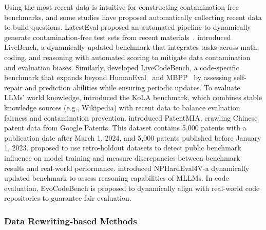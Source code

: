 Using the most recent data is intuitive for constructing contamination-free benchmarks, and some studies have proposed automatically collecting recent data to build questions.
LatestEval proposed an automated pipeline to dynamically generate contamination-free test sets from recent materials~\citep{li2024latestevaladdressingdatacontamination}. 
\citet{white2024livebench} introduced LiveBench, a dynamically updated benchmark that integrates tasks across math, coding, and reasoning with automated scoring to mitigate data contamination and evaluation biases. Similarly, \citet{jain2024livecodebench} developed LiveCodeBench, a code-specific benchmark that expands beyond HumanEval~\cite{chen2021codex} and MBPP~\citep{austin2021program} by assessing self-repair and prediction abilities while ensuring periodic updates. To evaluate LLMs' world knowledge, \citet{yu2023kola} introduced the KoLA benchmark, which combines stable knowledge sources (e.g., Wikipedia) with recent data to balance evaluation fairness and contamination prevention.
\citet{zhang-etal-2024-pretraining} introduced PatentMIA, crawling Chinese patent data from Google Patents. This dataset contains 5,000 patents with a publication date after March 1, 2024, and 5,000 patents published before January 1, 2023.
\citet{haimes2024benchmark} proposed to use retro-holdout datasets to detect public benchmark influence on model training and measure discrepancies between benchmark results and real-world performance.
\citet{fan2024nphardeval4vdynamicreasoningbenchmark} introduced NPHardEval4V-a dynamically updated benchmark to assess reasoning capabilities of MLLMs.
In code evaluation, EvoCodeBench is proposed to dynamically align with real-world code repositories to guarantee fair evaluation.

\subsubsection{Data Rewriting-based Methods}


